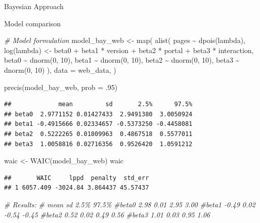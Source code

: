 \documentclass[
  ignorenonframetext,
]{beamer}
\newenvironment{Shaded}{\begin{snugshade}}{\end{snugshade}}
\newcommand{\AttributeTok}[1]{\textcolor[rgb]{0.77,0.63,0.00}{#1}}
\newcommand{\CommentTok}[1]{\textcolor[rgb]{0.56,0.35,0.01}{\textit{#1}}}
\newcommand{\DecValTok}[1]{\textcolor[rgb]{0.00,0.00,0.81}{#1}}
\newcommand{\FunctionTok}[1]{\textcolor[rgb]{0.00,0.00,0.00}{#1}}
\newcommand{\NormalTok}[1]{#1}
\newcommand{\OtherTok}[1]{\textcolor[rgb]{0.56,0.35,0.01}{#1}}
\newcommand{\SpecialCharTok}[1]{\textcolor[rgb]{0.00,0.00,0.00}{#1}}
\begin{document}
\begin{frame}[fragile]{Bayesian Approach}
\begin{block}{Model comparison}
\begin{Shaded}
\begin{Highlighting}[]
\CommentTok{\# Model formulation}
\NormalTok{model\_bay\_web }\OtherTok{\textless{}{-}} \FunctionTok{map}\NormalTok{(}
  \FunctionTok{alist}\NormalTok{(}
\NormalTok{    pages }\SpecialCharTok{\textasciitilde{}} \FunctionTok{dpois}\NormalTok{(lambda),}
    \FunctionTok{log}\NormalTok{(lambda) }\OtherTok{\textless{}{-}}\NormalTok{ beta0 }\SpecialCharTok{+}\NormalTok{ beta1 }\SpecialCharTok{*}\NormalTok{ version }\SpecialCharTok{+}\NormalTok{ beta2 }\SpecialCharTok{*}\NormalTok{ portal }\SpecialCharTok{+}\NormalTok{ beta3 }\SpecialCharTok{*}\NormalTok{ interaction,}
\NormalTok{    beta0 }\SpecialCharTok{\textasciitilde{}} \FunctionTok{dnorm}\NormalTok{(}\DecValTok{0}\NormalTok{, }\DecValTok{10}\NormalTok{),}
\NormalTok{    beta1 }\SpecialCharTok{\textasciitilde{}} \FunctionTok{dnorm}\NormalTok{(}\DecValTok{0}\NormalTok{, }\DecValTok{10}\NormalTok{),}
\NormalTok{    beta2 }\SpecialCharTok{\textasciitilde{}} \FunctionTok{dnorm}\NormalTok{(}\DecValTok{0}\NormalTok{, }\DecValTok{10}\NormalTok{),}
\NormalTok{    beta3 }\SpecialCharTok{\textasciitilde{}} \FunctionTok{dnorm}\NormalTok{(}\DecValTok{0}\NormalTok{, }\DecValTok{10}\NormalTok{)}
\NormalTok{  ),}
  \AttributeTok{data =}\NormalTok{ web\_data,}
\NormalTok{)}

\FunctionTok{precis}\NormalTok{(model\_bay\_web, }\AttributeTok{prob =}\NormalTok{ .}\DecValTok{95}\NormalTok{)}
\end{Highlighting}
\end{Shaded}

\begin{verbatim}
##             mean         sd       2.5%      97.5%
## beta0  2.9771152 0.01427433  2.9491380  3.0050924
## beta1 -0.4915666 0.02334657 -0.5373250 -0.4458081
## beta2  0.5222265 0.01809963  0.4867518  0.5577011
## beta3  1.0058816 0.02716356  0.9526420  1.0591212
\end{verbatim}

\begin{Shaded}
\begin{Highlighting}[]
\NormalTok{waic }\OtherTok{\textless{}{-}} \FunctionTok{WAIC}\NormalTok{(model\_bay\_web)}
\NormalTok{waic}
\end{Highlighting}
\end{Shaded}

\begin{verbatim}
##       WAIC     lppd  penalty  std_err
## 1 6057.409 -3024.84 3.864437 45.57437
\end{verbatim}

\begin{Shaded}
\begin{Highlighting}[]
\CommentTok{\# Results:}
\CommentTok{\#       mean   sd  2.5\% 97.5\%}
\CommentTok{\#beta0  2.98 0.01  2.95  3.00}
\CommentTok{\#beta1 {-}0.49 0.02 {-}0.54 {-}0.45}
\CommentTok{\#beta2  0.52 0.02  0.49  0.56}
\CommentTok{\#beta3  1.01 0.03  0.95  1.06}


\end{Highlighting}
\end{Shaded}
\end{block}
\end{frame}
\end{document}

